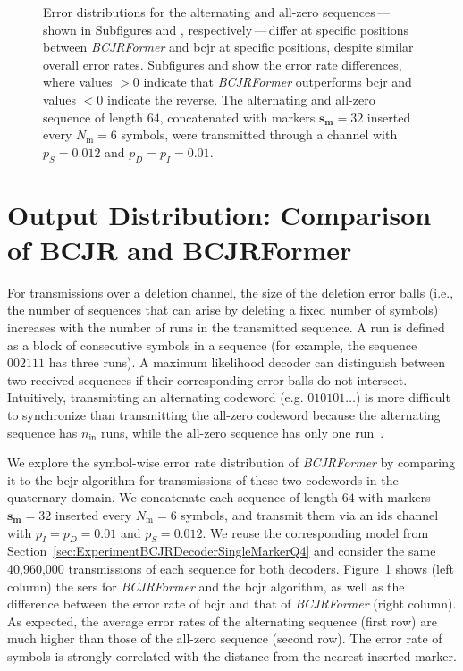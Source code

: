 \documentclass[conference,letterpaperu]{IEEEtran}
\newcommand{\pdel}{\ensuremath{p_D}}
\newcommand{\pins}{\ensuremath{p_I}}
\newcommand{\psub}{\ensuremath{p_S}}
\newcommand{\nin}{\ensuremath{n_{\text{in}}}}
\newcommand{\marker}{\ensuremath{\bm{s_{\text{m}}}}}
\newcommand{\markerFreq}{\ensuremath{N_{\text{m}}}}
\begin{document}
\begin{figure}[ht]
{}%
\caption{
Error distributions for the alternating and all-zero sequences\,---\,shown in Subfigures \protect{} and \protect{}, respectively\,---\,differ at specific positions between \textit{BCJRFormer} and \ac{bcjr} at specific positions, despite similar overall error rates. Subfigures \protect{} and \protect{} show the error rate differences, where values $>0$ indicate that \textit{BCJRFormer} outperforms \ac{bcjr} and values $<0$ indicate the reverse. The alternating and all-zero sequence of length $64$, concatenated with markers $\marker = 32$ inserted every $\markerFreq=6$ symbols, were transmitted through a channel with $\psub = 0.012$ and $\pdel = \pins = 0.01$. 
}
\label{fig:AppQuartErrDistr}
\end{figure}
\section{Output Distribution: Comparison of BCJR and BCJRFormer}
\label{sec:appBCJRFormerQuartDistribution}

For transmissions over a deletion channel, the size of the deletion error balls (i.e., the number of sequences that can arise by deleting a fixed number of symbols) increases with the number of runs in the transmitted sequence. A run is defined as a block of consecutive symbols in a sequence (for example, the sequence $002111$ has three runs). A maximum likelihood decoder can distinguish between two received sequences if their corresponding error balls do not intersect. Intuitively, transmitting an alternating codeword (e.g. $010101\ldots$) is more difficult to synchronize than transmitting the all-zero codeword because the alternating sequence has $\nin$ runs, while the all-zero sequence has only one run~\cite{sloaneSingledeletioncorrectingCodes2002a, mitzenmacherSurveyResultsDeletion2009a}. 

We explore the symbol-wise error rate distribution of \textit{BCJRFormer} by comparing it to the \ac{bcjr} algorithm for transmissions of these two codewords in the quaternary domain.
We concatenate each sequence of length $64$ with markers $\marker = 32$ inserted every $\markerFreq = 6$ symbols, and transmit them via an \ac{ids} channel with $\pins = \pdel = 0.01$ and $\psub = 0.012$. We reuse the corresponding model from Section~\ref{sec:ExperimentBCJRDecoderSingleMarkerQ4} and consider the same 40{,}960{,}000 transmissions of each sequence for both decoders. Figure~\ref{fig:AppQuartErrDistr} shows (left column) the \acp{ser} for \textit{BCJRFormer} and the \ac{bcjr} algorithm, as well as the difference between the error rate of \ac{bcjr} and that of \textit{BCJRFormer} (right column). As expected, the average error rates of the alternating sequence (first row) are much higher than those of the all-zero sequence (second row). The error rate of symbols is strongly correlated with the distance from the nearest inserted marker. 
\end{document}
